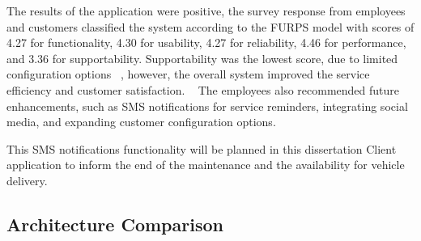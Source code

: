 The results of the application were positive, the survey response from employees and customers classified the system according to the \ac{FURPS} model with scores of 4.27 for functionality, 4.30 for usability, 4.27 for reliability, 4.46 for performance, and 3.36 for supportability.
Supportability was the lowest score, due to limited configuration options ~\cite{MAS_MOTORS}, however, the overall system improved the service efficiency and customer satisfaction. ~\cite{MAS_MOTORS}
The employees also recommended future enhancements, such as SMS notifications for service reminders, integrating social media, and expanding customer configuration options.

This SMS notifications functionality will be planned in this dissertation Client application to inform the end of the maintenance and the availability for vehicle delivery.  


\subsection{Architecture Comparison}



